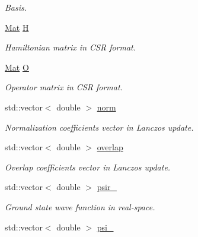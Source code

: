 \begin{DoxyCompactItemize}
\begin{DoxyCompactList}\small\item\em Basis. \end{DoxyCompactList}\item 
\hyperlink{classMat}{Mat} \hyperlink{classlhamil_af5eb4f55cd465808850890273b07d16a}{H}\hypertarget{classlhamil_af5eb4f55cd465808850890273b07d16a}{}\label{classlhamil_af5eb4f55cd465808850890273b07d16a}

\begin{DoxyCompactList}\small\item\em Hamiltonian matrix in C\+SR format. \end{DoxyCompactList}\item 
\hyperlink{classMat}{Mat} \hyperlink{classlhamil_afa93e49df6f87889602b9fd4e84c511f}{O}\hypertarget{classlhamil_afa93e49df6f87889602b9fd4e84c511f}{}\label{classlhamil_afa93e49df6f87889602b9fd4e84c511f}

\begin{DoxyCompactList}\small\item\em Operator matrix in C\+SR format. \end{DoxyCompactList}\item 
std\+::vector$<$ double $>$ \hyperlink{classlhamil_ae1e5cf1878aea2198372f64cd038ccc8}{norm}\hypertarget{classlhamil_ae1e5cf1878aea2198372f64cd038ccc8}{}\label{classlhamil_ae1e5cf1878aea2198372f64cd038ccc8}

\begin{DoxyCompactList}\small\item\em Normalization coefficients vector in Lanczos update. \end{DoxyCompactList}\item 
std\+::vector$<$ double $>$ \hyperlink{classlhamil_ab312761bed0e3f65e7143e06339e0773}{overlap}\hypertarget{classlhamil_ab312761bed0e3f65e7143e06339e0773}{}\label{classlhamil_ab312761bed0e3f65e7143e06339e0773}

\begin{DoxyCompactList}\small\item\em Overlap coefficients vector in Lanczos update. \end{DoxyCompactList}\item 
std\+::vector$<$ double $>$ \hyperlink{classlhamil_a30af2fba8c46ff87ec1144986321de93}{psir\+\_}\hypertarget{classlhamil_a30af2fba8c46ff87ec1144986321de93}{}\label{classlhamil_a30af2fba8c46ff87ec1144986321de93}

\begin{DoxyCompactList}\small\item\em Ground state wave function in real-\/space. \end{DoxyCompactList}\item 
std\+::vector$<$ double $>$ \hyperlink{classlhamil_ad46e5575cd78453a79a4960d8f050708}{psi\+\_}\hypertarget{classlhamil_ad46e5575cd78453a79a4960d8f050708}{}\label{classlhamil_ad46e5575cd78453a79a4960d8f050708}


\end{DoxyCompactItemize}
